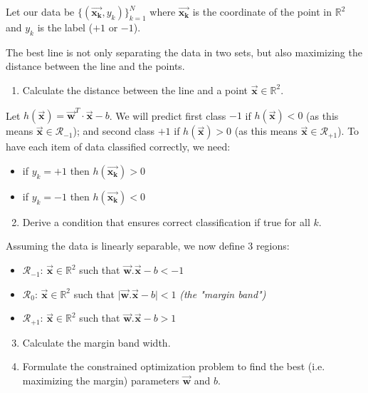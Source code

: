 \documentclass[]{article}
\newcommand{\R}{\mathbb{R}}
\newcommand{\vecx}{ \vec{\mathbf{x}} }
\newcommand{\vecxk}{ \vec{\mathbf{x_k}} }
\newcommand{\vecw}{ \vec{\mathbf{w}} }
\begin{document}
	Let our data be $\{ (\vecxk, y_k) \}_{k=1}^N$ where $\vecxk$ is the coordinate of the point in $\R^2$ and $y_k$ is the label ($+1$ or $-1$).
	
	The best line is not only separating the data in two sets, but also maximizing the distance between the line and the points.
	
	\begin{enumerate}
		\item Calculate the distance between the line and a point $\vecx \in \R^2$.
	\end{enumerate}
	
	\vspace{0.5cm}
	
	Let $h(\vecx) = \vecw^T \cdot \vecx - b$.
	We will predict first class $-1$ if $h(\vecx)<0$ (as this means $\vecx \in \mathcal{R}_{-1}$); and second class $+1$ if $h(\vecx)>0$ (as this means $\vecx \in \mathcal{R}_{+1}$).
	To have each item of data classified correctly, we need:
	\begin{itemize}
		\item if $y_k = +1$ then $h(\vecxk)>0$
		\item if $y_k = -1$ then $h(\vecxk)<0$
	\end{itemize}
	\begin{enumerate}
		\setcounter{enumi}{1}
		\item Derive a condition that ensures correct classification if true for all $k$.
	\end{enumerate}
	
	\vspace{0.5cm}
	
	Assuming the data is linearly separable, we now define 3 regions:
	\begin{itemize}
		\item $\mathcal{R}_{-1}$: $\vecx \in \R^2$ such that $\vecw.\vecx - b < -1$
		\item $\mathcal{R}_{ 0}$: $\vecx \in \R^2$ such that $\mid \vecw.\vecx - b \mid < 1$ \textit{(the "margin band")}
		\item $\mathcal{R}_{+1}$: $\vecx \in \R^2$ such that $\vecw.\vecx - b > 1$
	\end{itemize}
	\begin{enumerate}
		\setcounter{enumi}{2}
		\item Calculate the margin band width.
		\item Formulate the constrained optimization problem to find the best (i.e. maximizing the margin) parameters $\vecw$ and $b$.
	\end{enumerate}
	
\end{document}
